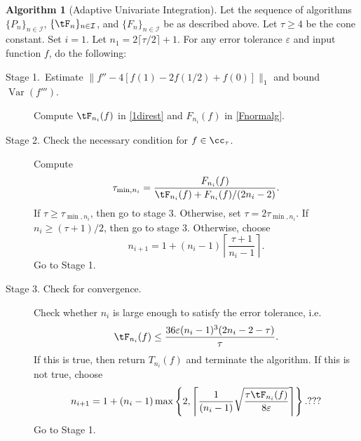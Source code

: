 \documentclass[]{elsarticle}
\DeclareMathOperator{\Var}{Var}
\theoremstyle{definition}
\newtheorem{algo}{Algorithm}
\theoremstyle{remark}
\begin{document}
\begin{algo}[Adaptive Univariate Integration] \label{multistageintegalgo}
Let the sequence of algorithms $\{P_n\}_{n\in \mathcal{I}}$, $\{\tF_n\}_{n\in \mathcal{I}}$, and $\{F_n\}_{n\in \mathcal{I}}$ be as described above.
Let $\tau\ge4$ be the cone constant. Set $i=1$. Let $n_1=2\lceil\tau/2\rceil+1$. For any error tolerance $\varepsilon$ and input function $f$, do the following:
\begin{description}
\item[Stage 1.\ Estimate {$\|f''-4[f(1)-2f(1/2)+f(0)]\|_1$} and bound {$\Var(f''')$}.] Compute $\tF_{n_i}(f)$ in \eqref{1direst} and $F_{n_i}(f)$ in \eqref{Fnormalg}.

\item[Stage 2. Check the necessary condition for $f \in \cc_{\tau}$.] Compute
    \begin{align*}
     \tau_{\min,n_i} =  \frac{F_{n_i}(f)}{\tF_{n_i}(f)+F_{n_i}(f)/(2n_i-2)}.
    \end{align*}
If $\tau \ge \tau_{\min,n_i}$, then go to stage 3.  Otherwise, set $\tau = 2\tau_{\min,n_i}$.  If $n_i \ge (\tau+1)/2$, then go to stage 3.  Otherwise, choose
$$
n_{i+1}=1+ (n_i-1)\left\lceil\frac{\tau+1}{n_i-1}\right\rceil.
$$
Go to Stage 1.

\item[Stage 3. Check for convergence.] Check whether $n_i$ is large enough to satisfy the error tolerance, i.e.
    \begin{equation*}
     \tF_{n_i}(f) \le \frac{36\varepsilon(n_i-1)^3(2n_i-2 - \tau)}{\tau}.
    \end{equation*}
If this is true, then return $T_{n_i}(f)$ and terminate the algorithm.   If this is not true, choose
$$
n_{i+1}=1+ (n_i-1)\max\left\{2,\left\lceil\frac{1}{(n_i-1)}\sqrt{\frac{\tau \tF_{n_i}(f)}{8\varepsilon}}\right\rceil\right\}.???
$$
Go to Stage 1.
\end{description}
\end{algo}
\end{document}

